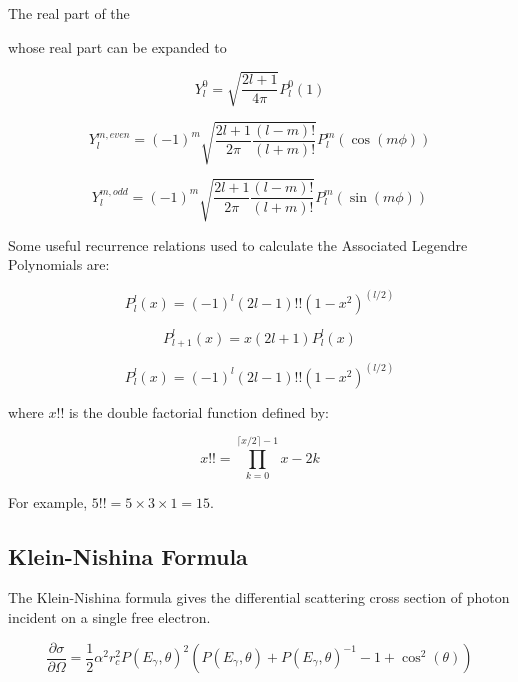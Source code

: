 \documentclass{article}
\numberwithin{equation}{subsection}
\begin{document}
The real part of the

whose real part can be expanded to

\begin{equation}
Y_l^0 = \sqrt{\frac{2l+1}{4 \pi}}P_l^0(1)
\end{equation}

\begin{equation}
Y_l^{m, even} = (-1)^m\sqrt{\frac{2l+1}{2 \pi} \frac{(l-m)!}{(l+m)!}}P_l^m(\cos(m \phi))
\end{equation}

\begin{equation}
Y_l^{m,odd} = (-1)^m \sqrt{\frac{2l+1}{2 \pi} \frac{(l-m)!}{(l+m)!}}P_l^m(\sin(m \phi))
\end{equation}

Some useful recurrence relations used to calculate the Associated Legendre Polynomials are:

\begin{equation}
P_l^l(x) = (-1)^l(2l-1)!!(1-x^2)^(l/2)
\end{equation}

\begin{equation}
P_{l+1}^l(x) = x(2l+1)P_l^l(x)
\end{equation}

\begin{equation}
P_l^l(x) = (-1)^l(2l-1)!!(1-x^2)^(l/2)
\end{equation}

where $x!!$ is the double factorial function defined by:

\begin{equation}
x!! = \prod_{k=0}^{\lceil x/2 \rceil - 1} x-2k
\end{equation}

For example, $5!! = 5 \times 3 \times 1 = 15$.

\subsection{Klein-Nishina Formula}

The Klein-Nishina formula gives the differential scattering cross section of photon incident on a single free electron.

\begin{equation}\label{klein_nishina}
\frac{\partial \sigma}{\partial \Omega} = \frac{1}{2}\alpha^2 r_c^2 P(E_\gamma, \theta)^2
\left( P(E_\gamma, \theta) + P(E_\gamma, \theta)^{-1} - 1 + \cos^2(\theta) \right)
\end{equation}
\end{document}
